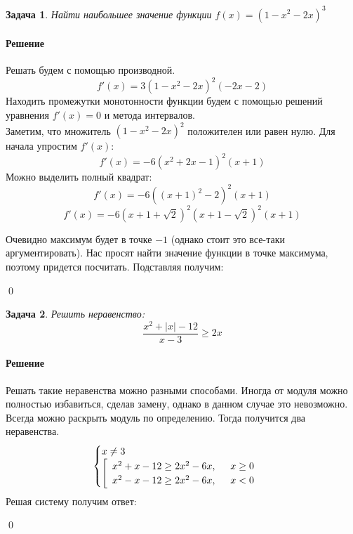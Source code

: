 \documentclass[a4paper,12pt]{report}
\newtheorem{problem}{Задача}[chapter]
\newenvironment{sol}{\paragraph{Решение}}{}
\newcommand{\uni}{\cup}
\begin{document}
	\begin{problem}
		\label{Extremum}
		Найти наибольшее значение функции $f(x)=(1-x^2-2x)^3$
	\end{problem}
	\begin{sol}
		Решать будем с помощью производной.
		\[f'(x)=3(1-x^2-2x)^2(-2x-2)\]
		Находить промежутки монотонности функции будем с помощью решений уравнения $f'(x)=0$ и метода интервалов.\\
		Заметим, что множитель $(1-x^2-2x)^2$ положителен или равен нулю. Для начала упростим $f'(x)$:
		\[
		f'(x)=-6(x^2+2x-1)^2(x+1)
		\]
		Можно выделить полный квадрат:
		\[
		f'(x)=-6((x+1)^2-2)^2(x+1)
		\]
		\[
		f'(x)=-6(x+1+\sqrt{2})^2(x+1-\sqrt{2})^2(x+1)
		\]
		\begin{figure}[H]
			\centering
		\end{figure}
		Очевидно максимум будет в точке $-1$ (однако стоит это все-таки аргументировать). Нас просят найти значение функции в точке максимума, поэтому придется посчитать. Подставляя получим:
		\begin{center}
		\end{center}
		\qed
	\end{sol}
	\begin{problem}
		Решить неравенство:
		\[
		\frac{x^2+|x|-12}{x-3}\geq2x
		\]
	\end{problem}
	\begin{sol}
		Решать такие неравенства можно разными способами. Иногда от модуля можно полностью избавиться, сделав замену, однако в данном случае это невозможно. Всегда можно раскрыть модуль по определению. Тогда получится два неравенства.
		\begin{equation*}
			\begin{cases}
				x\neq3\\
				\left[
				\begin{array}{ll}
					x^2+x-12\geq2x^2-6x, & \hspace{2mm} x\geq0\\
					x^2-x-12\geq2x^2-6x, & \hspace{2mm} x < 0
				\end{array}
				\right .
			\end{cases}
		\end{equation*}
		Решая систему получим ответ:
		\begin{center}
			\fbox{$(-\infty,3)\uni(3,4]$}
		\end{center}
		\qed
	\end{sol}
\end{document}
